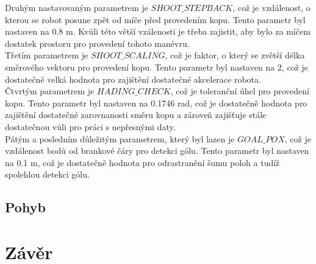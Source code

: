 \documentclass[a4paper,12pt]{article}
\begin{document}
Druhým nastavovaným parametrem je $SHOOT\_STEPBACK$, což je vzdálenost, o kterou se robot posune zpět od míče před provedením kopu. Tento parametr byl nastaven na 0.8 m. Kvůli této větší vzálenosti je třeba zajistit, aby bylo za míčem dostatek prostoru pro provedení tohoto manévru.\\
Třetím parametrem je $SHOOT\_SCALING$, což je faktor, o který se zvětší délka směrového vektoru pro provedení kopu. Tento parametr byl nastaven na 2, což je dostatečně velká hodnota pro zajištění dostatečné akcelerace robota.\\
Čtvrtým parametrem je $HADING\_CHECK$, což je toleranční úhel pro provedení kopu. Tento parametr byl nastaven na 0.1746 rad, což je dostatečně hodnota pro zajištění dostatečné zarovnanosti směru kopu a zároveň zajišťuje stále dostatečnou vůli pro práci s nepřesnými daty.\\
Pátým a posledním důležitým parametrem, který byl lazen je $GOAL\_POX$, což je vzdálenost bodů od brankové čáry pro detekci gólu. Tento parametr byl nastaven na 0.1 m, což je dostatečně hodnota pro odrastranění šumu poloh a tudíž spolehlou detekci gólu.\\

\subsection{Pohyb}


\section{Závěr}
\end{document}
